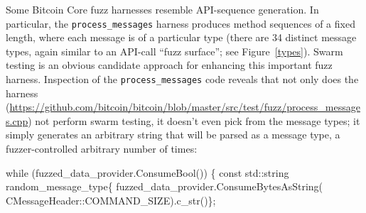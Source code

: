 Some Bitcoin Core fuzz harnesses resemble API-sequence generation.  In particular, the {\tt process\_messages} harness produces method sequences of a fixed length, where each message is of a particular type (there are  34 distinct message types, again similar to an API-call ``fuzz surface''; see Figure~\ref{types}).  Swarm testing is an obvious candidate approach for enhancing this important fuzz harness.  Inspection of the {\tt process\_messages} code reveals that not only does the harness (\url{https://github.com/bitcoin/bitcoin/blob/master/src/test/fuzz/process_messages.cpp}) not perform swarm testing, it doesn't even pick from the message types; it simply generates an arbitrary string that will be parsed as a message type, a fuzzer-controlled arbitrary number of times:

\begin{code}
while (fuzzed\_data\_provider.ConsumeBool()) \{
  const std::string random\_message\_type\{
    fuzzed\_data\_provider.ConsumeBytesAsString(
      CMessageHeader::COMMAND\_SIZE).c\_str()\};
\end{code}

